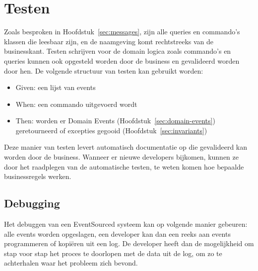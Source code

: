 
\section{Testen}
\label{sec:testen}

Zoals besproken in Hoofdstuk~\ref{sec:messages}, zijn alle queries en commando’s klassen die leesbaar zijn, en de naamgeving komt rechtstreeks van de businesskant. Testen schrijven voor de domain logica zoals commando’s en queries kunnen ook opgesteld worden door de business en gevalideerd worden door hen.
De volgende structuur van testen kan gebruikt worden:

\begin{itemize}
  \item{Given: een lijst van events}
  \item{When: een commando uitgevoerd wordt}
  \item{Then: worden er Domain Events (Hoofdstuk~\ref{sec:domain-events}) geretourneerd of excepties gegooid (Hoofdstuk~\ref{sec:invariants})}
\end{itemize}

Deze manier van testen levert automatisch documentatie op die gevalideerd kan worden door de business.
Wanneer er nieuwe developers bijkomen, kunnen ze door het raadplegen van de automatische testen, te weten komen hoe bepaalde businessregels werken.


\subsection{Debugging}
\label{subsec:debugging}

Het debuggen van een EventSourced systeem kan op volgende manier gebeuren: alle events worden opgeslagen, een developer kan dan een reeks aan events programmeren of kopiëren uit een \gls{log}. De developer heeft dan de mogelijkheid om stap voor stap het proces te doorlopen met de data uit de \gls{log}, om zo te achterhalen waar het probleem zich bevond.